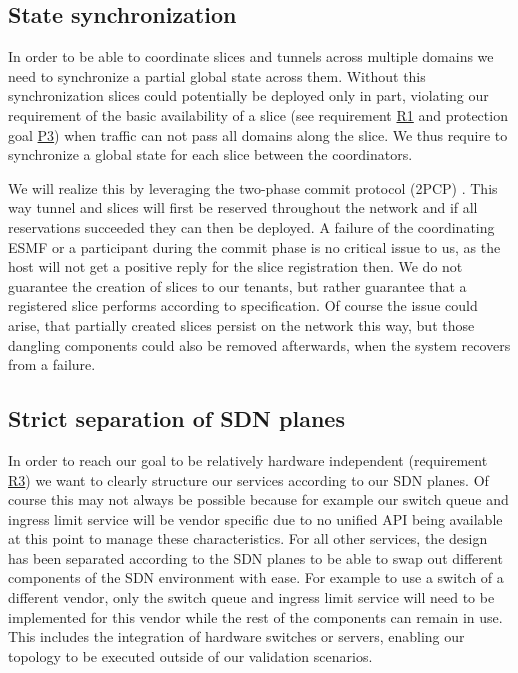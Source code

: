\subsection{State synchronization}
In order to be able to coordinate slices and tunnels across multiple domains we need to synchronize a partial global state across them. Without this synchronization slices could potentially be deployed only in part, violating our requirement of the basic availability of a slice (see requirement \hyperref[R1]{R1} and protection goal \hyperref[P3]{P3}) when traffic can not pass all domains along the slice. We thus require to synchronize a global state for each slice between the coordinators.

We will realize this by leveraging the two-phase commit protocol (2PCP) \cite{2pcp}. This way tunnel and slices will first be reserved throughout the network and if all reservations succeeded they can then be deployed. A failure of the coordinating ESMF or a participant during the commit phase is no critical issue to us, as the host will not get a positive reply for the slice registration then. We do not guarantee the creation of slices to our tenants, but rather guarantee that a registered slice performs according to specification. Of course the issue could arise, that partially created slices persist on the network this way, but those dangling components could also be removed afterwards, when the system recovers from a failure.

\subsection{Strict separation of SDN planes}
In order to reach our goal to be relatively hardware independent (requirement \hyperref[R3]{R3}) we want to clearly structure our services according to our SDN planes. Of course this may not always be possible because for example our switch queue and ingress limit service will be vendor specific due to no unified API being available at this point to manage these characteristics. For all other services, the design has been separated according to the SDN planes to be able to swap out different components of the SDN environment with ease. For example to use a switch of a different vendor, only the switch queue and ingress limit service will need to be implemented for this vendor while the rest of the components can remain in use. This includes the integration of hardware switches or servers, enabling our topology to be executed outside of our validation scenarios.
